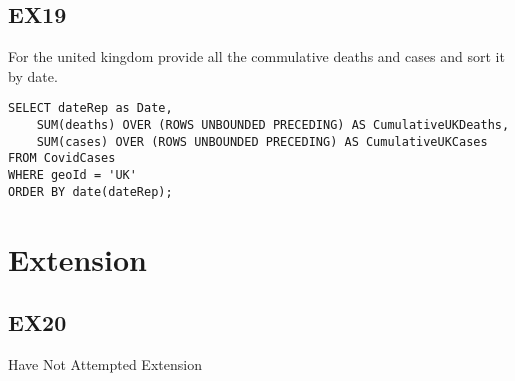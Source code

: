 \documentclass{article}
\begin{document}
\subsection{EX19}
For the united kingdom provide all the commulative deaths and cases and sort it by date.
\begin{verbatim}
SELECT dateRep as Date,
	SUM(deaths) OVER (ROWS UNBOUNDED PRECEDING) AS CumulativeUKDeaths,
	SUM(cases) OVER (ROWS UNBOUNDED PRECEDING) AS CumulativeUKCases
FROM CovidCases
WHERE geoId = 'UK'
ORDER BY date(dateRep);
\end{verbatim}
\section{Extension}
\subsection{EX20}
Have Not Attempted Extension
\end{document}
